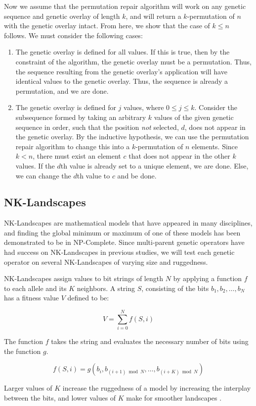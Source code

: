 Now we assume that the permutation repair algorithm will work on any genetic sequence and genetic overlay of length $k$, and will return a $k$-permutation of $n$ with the genetic overlay intact. From here, we show that the case of $k \leq n$ follows. We must consider the following cases:
\begin{enumerate}
\item The genetic overlay is defined for all values. 
If this is true, then by the constraint of the algorithm, the genetic overlay must be a permutation. Thus, the sequence resulting from the genetic overlay's application will have identical values to the genetic overlay. Thus, the sequence is already a permutation, and we are done.

\item The genetic overlay is defined for $j$ values, where $0 \leq j \leq k $. 
Consider the subsequence formed by taking an arbitrary $k$ values of the given genetic sequence in order, such that the position \emph{not} selected, $d$, does not appear in the genetic overlay. By the inductive hypothesis, we can use the permutation repair algorithm to change this into a $k$-permutation of $n$ elements. Since $k < n$, there must exist an element $c$ that does not appear in the other $k$ values. If the $d$th value is already set to a unique element, we are done. Else, we can change the $d$th value to $c$ and be done.
\end{enumerate}

%
%

\subsection*{NK-Landscapes}

NK-Landscapes are mathematical models that have appeared in many disciplines, and finding the global minimum or maximum of one of these models has been demonstrated to be in NP-Complete\cite{Weinberger96}. Since multi-parent genetic operators have had success on NK-Landscapes in previous studies, we will test each genetic operator on several NK-Landscapes of varying size and ruggedness\cite{Eiben96,Skellett05}. 

NK-Landscapes assign values to bit strings of length $N$ by applying a function $f$ to each allele and its $K$ neighbors\cite{Kauffman93}. A string $S$, consisting of the bits $b_1,b_2,\ldots,b_N$ has a fitness value $V$ defined to be:

\[ V = \sum\limits_{i = 0}^{N} f(S,i) \]

The function $f$ takes the string and evaluates the necessary number of bits using the function $g$.

\[ f(S,i) = g(b_i, b_{(i+1) \bmod{N}}, \ldots, b_{(i+K) \bmod{N}}) \]

Larger values of $K$ increase the ruggedness of a model by increasing the interplay between the bits, and lower values of $K$ make for smoother landscapes \cite{Kauffman93}.
